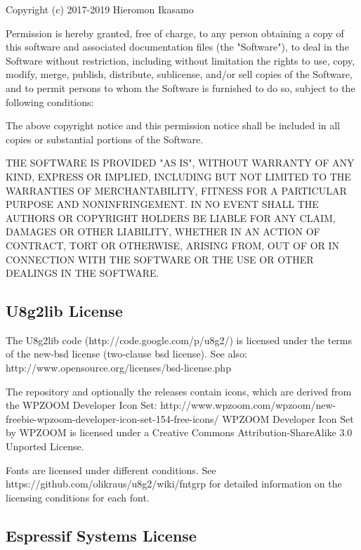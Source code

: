 \begin{DoxyVerb}   Copyright (c) 2017-2019 Hieromon Ikasamo

   Permission is hereby granted, free of charge, to any person obtaining a copy
   of this software and associated documentation files (the "Software"), to deal
   in the Software without restriction, including without limitation the rights
   to use, copy, modify, merge, publish, distribute, sublicense, and/or sell
   copies of the Software, and to permit persons to whom the Software is
   furnished to do so, subject to the following conditions:

   The above copyright notice and this permission notice shall be included in all
   copies or substantial portions of the Software.

   THE SOFTWARE IS PROVIDED "AS IS", WITHOUT WARRANTY OF ANY KIND, EXPRESS OR
   IMPLIED, INCLUDING BUT NOT LIMITED TO THE WARRANTIES OF MERCHANTABILITY,
   FITNESS FOR A PARTICULAR PURPOSE AND NONINFRINGEMENT. IN NO EVENT SHALL THE
   AUTHORS OR COPYRIGHT HOLDERS BE LIABLE FOR ANY CLAIM, DAMAGES OR OTHER
   LIABILITY, WHETHER IN AN ACTION OF CONTRACT, TORT OR OTHERWISE, ARISING FROM,
   OUT OF OR IN CONNECTION WITH THE SOFTWARE OR THE USE OR OTHER DEALINGS IN THE
   SOFTWARE.
\end{DoxyVerb}
\hypertarget{index_u8gLic}{}\subsection{U8g2lib License}\label{index_u8gLic}
\begin{DoxyVerb}   The U8g2lib code (http://code.google.com/p/u8g2/) is licensed under the terms of 
   the new-bsd license (two-clause bsd license).
   See also: http://www.opensource.org/licenses/bsd-license.php

   The repository and optionally the releases contain icons, which are
   derived from the WPZOOM Developer Icon Set:
   http://www.wpzoom.com/wpzoom/new-freebie-wpzoom-developer-icon-set-154-free-icons/
   WPZOOM Developer Icon Set by WPZOOM is licensed under a Creative Commons 
   Attribution-ShareAlike 3.0 Unported License.

   Fonts are licensed under different conditions.
   See  https://github.com/olikraus/u8g2/wiki/fntgrp
   for detailed information on the licensing conditions for each font. 
\end{DoxyVerb}
\hypertarget{index_EspressifLic}{}\subsection{Espressif Systems License}\label{index_EspressifLic}
